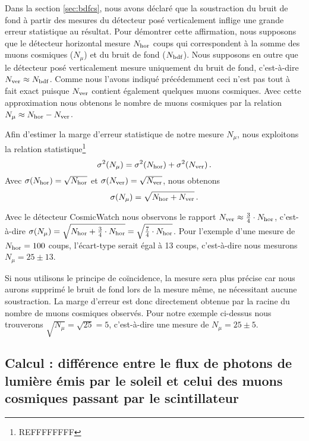 \documentclass[a4paper, 12pt]{article}
\begin{document}
\begin{spacing}{1.5}
Dans la section \ref{sec:bdfcs}, nous avons déclaré que la soustraction du bruit de fond à partir des mesures du détecteur posé verticalement inflige une grande erreur statistique au résultat. Pour démontrer cette affirmation, nous supposons que le détecteur horizontal mesure $N_{\rm hor}$ coups qui correspondent à la somme des muons cosmiques ($N_\mu$) et du bruit de fond ($N_{\rm bdf}$). Nous supposons en outre que le détecteur posé verticalement mesure uniquement du bruit de fond, c'est-à-dire $N_{\rm ver} \approx N_{\rm bdf}$. Comme nous l'avons indiqué précédemment ceci n'est pas tout à fait exact puisque $N_{\rm ver}$ contient également quelques muons cosmiques. Avec cette approximation nous obtenons le nombre de muons cosmiques par la relation $N_\mu \approx N_{\rm hor} - N_{\rm ver}$.

Afin d'estimer la marge d'erreur statistique de notre mesure $N_\mu$, nous exploitons la relation statistique\footnote{REFFFFFFFF}
\begin{equation}
\sigma^2(N_\mu) = \sigma^2(N_{\rm hor}) + \sigma^2(N_{\rm ver})\,. \label{eq:math1}
\end{equation}
Avec $\sigma(N_{\rm hor}) = \sqrt{N_{\rm hor}}$ et $\sigma(N_{\rm ver}) = \sqrt{N_{\rm ver}}$, nous obtenons
\begin{equation}
\sigma(N_\mu) = \sqrt{N_{\rm hor} + N_{\rm ver}}\,.
\end{equation}

Avec le détecteur CosmicWatch nous observons le rapport $N_{\rm ver} \approx \frac{3}{4}\cdot N_{\rm hor}$, c'est-à-dire $\sigma(N_\mu) = \sqrt{N_{\rm hor} + \frac{3}{4}\cdot N_{\rm hor}} = \sqrt{\frac{7}{4}\cdot N_{\rm hor}}$. Pour l'exemple d'une mesure de $N_{\rm hor} =100$ coups, l'écart-type serait égal à 13 coups, c'est-à-dire nous mesurons $N_\mu = 25 \pm 13$.

Si nous utilisons le principe de coïncidence, la mesure sera plus précise car nous aurons supprimé le bruit de fond lors de la mesure même, ne nécessitant aucune soustraction. La marge d'erreur est donc directement obtenue par la racine du nombre de muons cosmiques observés. Pour notre exemple ci-dessus nous trouverons $\sqrt{N_\mu} = \sqrt{25} = 5$, c'est-à-dire une mesure de $N_\mu = 25 \pm 5$.

\subsection{Calcul : différence entre le flux de photons de lumière émis par le soleil et celui des muons cosmiques passant par le scintillateur}
\label{sec:annexe-differenceinflux}


\end{spacing}
\end{document}
